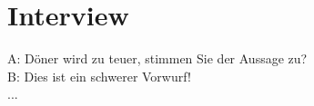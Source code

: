 \section{Interview}
A: Döner wird zu teuer, stimmen Sie der Aussage zu?\\
B: Dies ist ein schwerer Vorwurf!\\
...